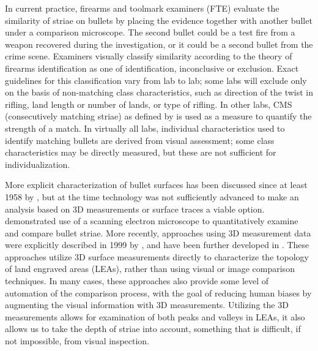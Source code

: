 \documentclass[doubleblind]{elsarticle}\usepackage[]{graphicx}\usepackage[]{color}
\begin{document}
 
In current practice, firearms and toolmark examiners (FTE) evaluate the similarity of striae on bullets by placing the evidence together with another bullet under a comparison microscope. The second bullet could be a test fire from a weapon recovered during the investigation, or it could be a second bullet from the crime scene. Examiners visually classify similarity according to the theory of firearms identification \citep{identification} as one of identification, inconclusive or exclusion. Exact guidelines for this classification vary from lab to lab; some labs will exclude only on the basis of non-matching class characteristics, such as direction of the twist in rifling, land length or number of lands, or type of rifling. In other labs, CMS (consecutively matching striae) as defined by \citeauthor{biasotti} \citep{biasotti} is used as a measure to quantify the strength of a match. In virtually all labs, individual characteristics used to identify matching bullets are derived from visual assessment; some class characteristics may be directly measured, but these are not sufficient for individualization. 


More explicit characterization of bullet surfaces has been discussed since at least 1958 by \citeauthor{davis1968introduction} \cite{davis1968introduction}, but at the time technology was not sufficiently advanced to make an analysis based on 3D measurements or surface traces a viable option. \citet{ComputerIdentificationBullets1978} demonstrated use of a scanning electron microscope to quantitatively examine and compare bullet striae. More recently, approaches using 3D measurement data were explicitly described in 1999 by \citeauthor{dekinderAutomatedComparisonsBullet1999} \cite{dekinderAutomatedComparisonsBullet1999}, and have been further developed in \citep{bachrachDevelopment3DbasedAutomated2002,xieAutomatedBulletidentificationSystem2009, chuPilotStudyAutomated2010}. These approaches utilize 3D surface measurements directly to characterize the topology of land engraved areas (LEAs), rather than using visual or image comparison techniques. In many cases, these approaches also provide some level of automation of the comparison process, with the goal of reducing human biases by augmenting the visual information with 3D measurements. Utilizing the 3D measurements allows for examination of both peaks and valleys in LEAs, it also allows us to take the depth of striae into account, something that is difficult, if not impossible, from visual inspection.
\end{document}
